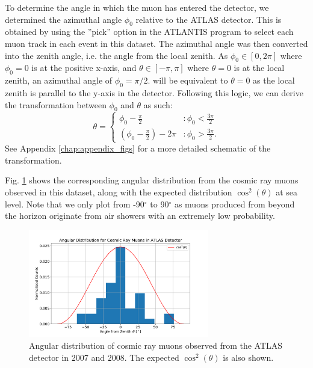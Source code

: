 \documentclass[a4paper]{report}
\numberwithin{equation}{section}
\begin{document}
To determine the angle in which the muon has entered the detector, we determined the azimuthal angle $\phi_0$ relative to the ATLAS detector. 
This is obtained by using the ''pick'' option in the ATLANTIS program to select each muon track in each event in this dataset. The azimuthal 
angle was then converted into the zenith angle, i.e. the angle from the local zenith. As $\phi_0 \in [0, 2\pi]$ where $\phi_0=0$ 
is at the positive x-axis, and $\theta \in [-\pi, \pi]$ where $\theta = 0$ is at the local zenith, an azimuthal angle of $\phi_0 = \pi / 2.$
will be equivalent to $\theta = 0$ as the local zenith is parallel to the y-axis in the detector. Following this logic, we can derive
the transformation between $\phi_0$ and $\theta$ as such: 
\begin{equation}
	\theta = 
	\begin{cases}
		\phi_0 - \frac{\pi}{2}   & : \phi_0 < \frac{3\pi}{2}\\
		(\phi_0 - \frac{\pi}{2}) - 2\pi & : \phi_0 > \frac{3\pi}{2}.
	\end{cases}
\end{equation}
See Appendix \ref{chap:appendix_figs} for a more detailed schematic of the transformation. \par 

Fig. \ref{fig:muon_angdist} shows the corresponding angular distribution from the cosmic ray muons observed in this dataset, along with the expected 
distribution $\cos^2 (\theta)$ at sea level. Note that we only plot from -90$^\circ$ to 90$^\circ$ as muons produced from beyond the horizon 
originate from air showers with an extremely low probability.\par 
\begin{figure}[htpb]
    \centering
    \includegraphics[width=0.7\textwidth]{muon_angdist.pdf}
    \caption{Angular distribution of cosmic ray muons observed from the ATLAS detector in 2007 and 2008. The expected $\cos^2 (\theta)$
	is also shown.}
    \label{fig:muon_angdist}
\end{figure}
\end{document}

